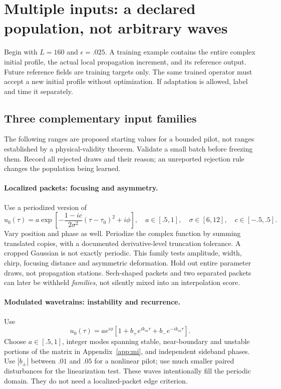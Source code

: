 \section{Multiple inputs: a declared population, not arbitrary waves}
\label{sec:data}

Begin with $L=160$ and $\epsilon=.025$. A training example contains the
entire complex initial profile, the actual local propagation increment,
and its reference output. Future reference fields are training targets
only. The same trained operator must accept a new initial profile
without optimization. If adaptation is allowed, label and time it
separately.

\subsection{Three complementary input families}
The following ranges are proposed starting values for a bounded pilot,
not ranges established by a physical-validity theorem. Validate a small
batch before freezing them. Record all rejected draws and their reason;
an unreported rejection rule changes the population being learned.

\paragraph{Localized packets: focusing and asymmetry.}
Use a periodized version of
\[
u_0(\tau)=a\exp\left[-\frac{1-ic}{2\sigma^2}(\tau-\tau_0)^2+i\phi\right],
\quad
a\in[.5,1],\quad \sigma\in[6,12],\quad c\in[-.5,.5].
\]
Vary position and phase as well. Periodize the complex function by summing
translated copies, with a documented derivative-level truncation tolerance.
A cropped Gaussian is not exactly periodic. This family tests amplitude,
width, chirp, focusing distance and asymmetric deformation. Hold out
entire parameter draws, not propagation stations. Sech-shaped packets
and two separated packets can later be withheld \emph{families}, not
silently mixed into an interpolation score.

\paragraph{Modulated wavetrains: instability and recurrence.}
Use
\[
u_0(\tau)=a e^{i\phi}
 \left[1+b_+e^{ik_m\tau}+b_-e^{-ik_m\tau}\right].
\]
Choose $a\in[.5,1]$, integer modes spanning stable, near-boundary and
unstable portions of the matrix in Appendix~\ref{app:mi}, and independent
sideband phases. Use $|b_\pm|$ between $.01$ and $.05$ for a nonlinear
pilot; use much smaller paired disturbances for the linearization test.
These waves intentionally fill the periodic domain. They do not need a
localized-packet edge criterion.


